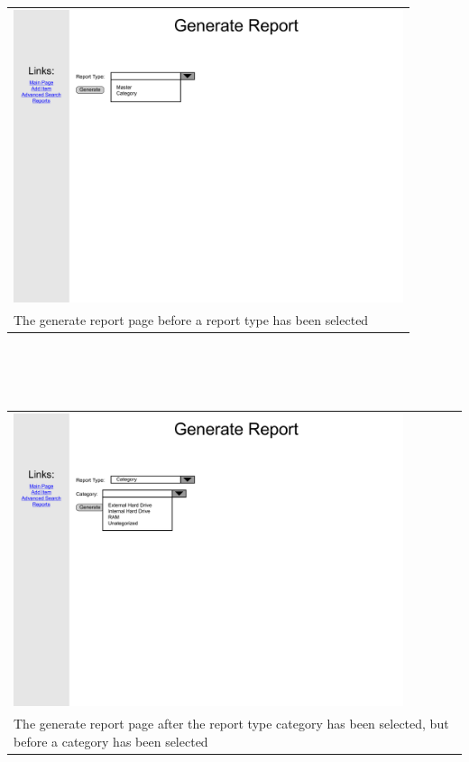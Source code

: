 \documentclass{article}
\begin{document}
\begin{tabular}{ p{4.5in} }
\includegraphics[keepaspectratio, width=4.5in]{generateReportF0S1.pdf} \\
The generate report page before a report type has been selected
\end{tabular}\\
~\\
~\\
\begin{tabular}{ p{4.5in} }
\includegraphics[keepaspectratio, width=4.5in]{generateReportF0S2.pdf} \\
The generate report page after the report type category has been selected, but before a category has been selected
\end{tabular}\\
~\\
~\\
\end{document}
